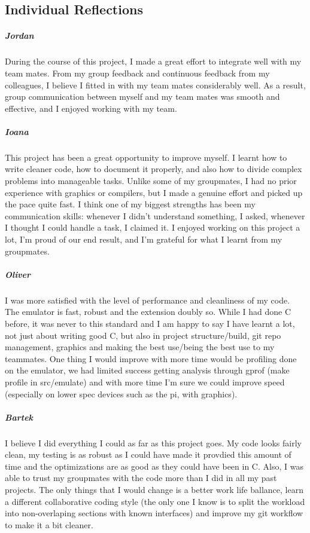 \documentclass[11pt]{article}
\begin{document}
\subsection*{Individual Reflections}

\subparagraph*{Jordan}
During the course of this project, I made a great effort to integrate well with my team mates. From my group feedback and continuous feedback from my colleagues, I believe I fitted in with my team mates considerably well. As a result, group communication between myself and my team mates was smooth and effective, and I enjoyed working with my team.
\subparagraph*{Ioana}
This project has been a great opportunity to improve myself. I learnt how to write cleaner code, how to document it properly, and also how to divide complex problems into manageable tasks. Unlike some of my groupmates, I had no prior experience with graphics or compilers, but I made a genuine effort and picked up the pace quite fast. I think one of my biggest strengths has been my communication skills: whenever I didn't understand something, I asked, whenever I thought I could handle a task, I claimed it. I enjoyed working on this project a lot, I'm proud of our end result, and I'm grateful for what I learnt from my groupmates.
\subparagraph*{Oliver}
I was more satisfied with the level of performance and cleanliness of my code. The emulator is fast, robust and the extension doubly so. While I had done C before, it was never to this standard and I am happy to say I have learnt a lot, not just about writing good C, but also in project structure/build, git repo management, graphics and making the best use/being the best use to my teammates. One thing I would improve with more time would be profiling done on the emulator, we had limited success getting analysis through gprof (make profile in src/emulate) and with more time I'm sure we could improve speed (especially on lower spec devices such as the pi, with graphics).
\subparagraph*{Bartek}
I believe I did everything I could as far as this project goes. My code looks fairly clean, my testing is as robust as I could have made it provdied this amount of time and the optimizations are as good as they could have been in C. Also, I was able to trust my groupmates with the code more than I did in all my past projects. The only things that I would change is a better work life ballance, learn a different collaborative coding style (the only one I know is to split the workload into non-overlaping sections with known interfaces) and improve my git workflow to make it a bit cleaner.
\end{document}
